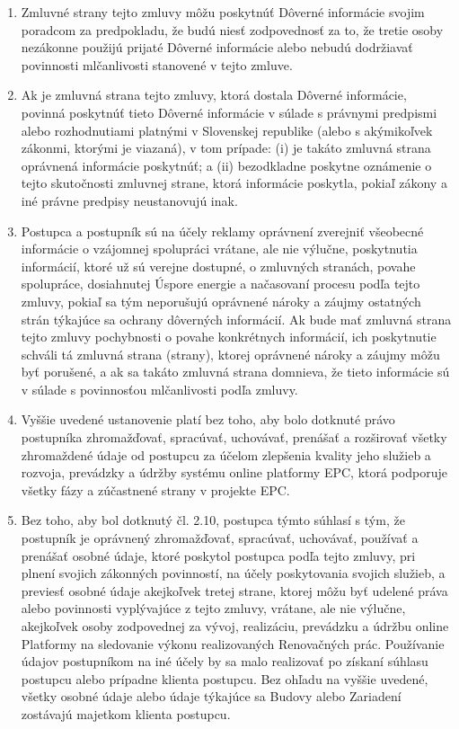 \documentclass[a4paper]{article}
\begin{document}
\begin{multicols}{2}
\begin{enumerate}
    \item Zmluvné strany tejto zmluvy môžu poskytnúť Dôverné informácie svojim poradcom za predpokladu, že budú niesť zodpovednosť za to, že tretie osoby nezákonne použijú prijaté Dôverné informácie alebo nebudú dodržiavať povinnosti mlčanlivosti stanovené v tejto zmluve.
    \item Ak je zmluvná strana tejto zmluvy, ktorá dostala Dôverné informácie, povinná poskytnúť tieto Dôverné informácie v súlade s právnymi predpismi alebo rozhodnutiami platnými v Slovenskej republike (alebo s akýmikoľvek zákonmi, ktorými je viazaná), v tom prípade: (i) je takáto zmluvná strana oprávnená informácie poskytnúť; a (ii) bezodkladne poskytne oznámenie o tejto skutočnosti zmluvnej strane, ktorá informácie poskytla, pokiaľ zákony a iné právne predpisy neustanovujú inak. 
    \item Postupca a postupník sú na účely reklamy oprávnení zverejniť všeobecné informácie o vzájomnej spolupráci vrátane, ale nie výlučne, poskytnutia informácií, ktoré už sú verejne dostupné, o zmluvných stranách, povahe spolupráce, dosiahnutej Úspore energie a načasovaní procesu podľa tejto zmluvy, pokiaľ sa tým neporušujú oprávnené nároky a záujmy ostatných strán týkajúce sa ochrany dôverných informácií. Ak bude mať zmluvná strana tejto zmluvy pochybnosti o povahe konkrétnych informácií, ich poskytnutie schváli tá zmluvná strana (strany), ktorej oprávnené nároky a záujmy môžu byť porušené, a ak sa takáto zmluvná strana domnieva, že tieto informácie sú v súlade s povinnosťou mlčanlivosti podľa zmluvy.
  	\item Vyššie uvedené ustanovenie platí bez toho, aby bolo dotknuté právo postupníka zhromažďovať, spracúvať, uchovávať, prenášať a rozširovať všetky zhromaždené údaje od postupcu za účelom zlepšenia kvality jeho služieb a rozvoja, prevádzky a údržby systému online platformy EPC, ktorá podporuje všetky fázy a zúčastnené strany v projekte EPC.
   	\item Bez toho, aby bol dotknutý čl. 2.10, postupca týmto súhlasí s tým, že postupník je oprávnený zhromažďovať, spracúvať, uchovávať, používať a prenášať osobné údaje, ktoré poskytol postupca podľa tejto zmluvy, pri plnení svojich zákonných povinností, na účely poskytovania svojich služieb, a previesť osobné údaje akejkoľvek tretej strane, ktorej môžu byť udelené práva alebo povinnosti vyplývajúce z tejto zmluvy, vrátane, ale nie výlučne, akejkoľvek osoby zodpovednej za vývoj, realizáciu, prevádzku a údržbu online Platformy na sledovanie výkonu realizovaných Renovačných prác. Používanie údajov postupníkom na iné účely by sa malo realizovať po získaní súhlasu postupcu alebo prípadne klienta postupcu. Bez ohľadu na vyššie uvedené, všetky osobné údaje alebo údaje týkajúce sa Budovy alebo Zariadení zostávajú majetkom klienta postupcu.

\end{enumerate}
\end{multicols}
\end{document}
